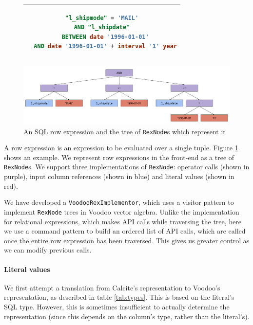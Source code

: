 \begin{figure}
    \centering
    \begin{tabular}{|c|}
    \hline
    \begin{lstlisting}[language=SQL]
"l_shipmode" = 'MAIL'
AND "l_shipdate"
  BETWEEN date '1996-01-01'
  AND date '1996-01-01' + interval '1' year
    \end{lstlisting} \\
    \hline
    \end{tabular}
    \includegraphics[width=\linewidth]{design-and-implementation/rex-node.pdf}
    \caption{An SQL row expression and the tree of \texttt{RexNode}s which represent it}
    \label{fig:rex}
\end{figure}

A row expression is an expression to be evaluated over a single tuple. Figure \ref{fig:rex} shows an example. We represent row expressions in the front-end as a tree of \texttt{RexNode}s. We support three implementations of \texttt{RexNode}: operator calls (shown in purple), input column references (shown in blue) and literal values (shown in red).

We have developed a \texttt{VoodooRexImplementor}, which uses a visitor pattern to implement \texttt{RexNode} trees in Voodoo vector algebra. Unlike the implementation for relational expressions, which makes API calls while traversing the tree, here we use a command pattern to build an ordered list of API calls, which are called once the entire row expression has been traversed. This gives us greater control as we can modify previous calls.

\paragraph{Literal values}
We first attempt a translation from Calcite's representation to Voodoo's representation, as described in table \ref{tab:types}. This is based on the literal's SQL type. However, this is sometimes insufficient to actually determine the representation (since this depends on the column's type, rather than the literal's).

